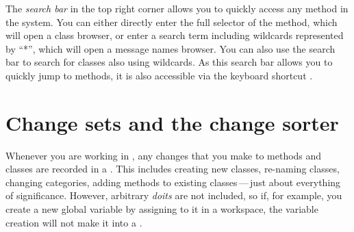 \documentclass[a4paper,10pt,twoside]{book}
\begin{document}
The \emph{search bar} in the top right corner allows you to quickly access any method in the system.
You can either directly enter the full selector of the method, which will open a class browser, or enter a search term including wildcards represented by ``*'', which will open a message names browser.
You can also use the search bar to search for classes also using wildcards.
As this search bar allows you to quickly jump to methods, it is also accessible via the keyboard shortcut .



\section{Change sets and the change sorter}
\label{sec:env:changeSet} %

Whenever you are working in \sq, any changes that you make to methods and classes are recorded in a .
This includes creating new classes, re-naming classes, changing categories, adding methods to existing classes\,---\,just about everything of significance.
However, arbitrary \emph{doits} are not included, so if, for example, you create a new global variable by assigning to it in a workspace, the variable creation will not make it into a .
\end{document}
